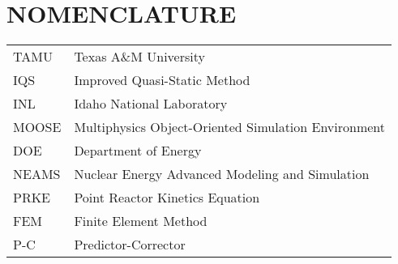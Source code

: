 %
%
%
%


\chapter*{NOMENCLATURE}

\vspace{-0.5in}
	\begin{table}[htbp]
	    \begin{tabular}{@{}p{} p{}@{}}
		TAMU	&	Texas A\&M University\\	[2ex]
		IQS 	& 	Improved Quasi-Static Method\\ [2ex]
		INL 	& 	Idaho National Laboratory\\ [2ex]
		MOOSE 	& 	Multiphysics Object-Oriented Simulation Environment\\ [2ex]
		DOE 	& 	Department of Energy\\ [2ex]
		NEAMS 	& 	Nuclear Energy Advanced Modeling and Simulation\\ [2ex]
		PRKE 	& 	Point Reactor Kinetics Equation\\ [2ex]
		FEM 	& 	Finite Element Method\\ [2ex]
		P-C 	& 	Predictor-Corrector\\ [2ex]
	    \end{tabular}%
	\end{table}

\pagebreak{}